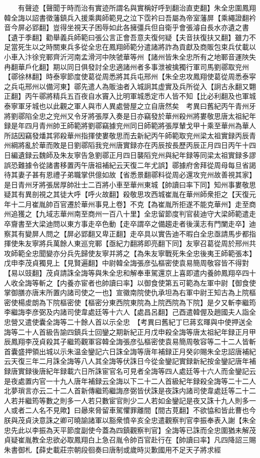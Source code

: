 　　有聲迹【聲聞于時而治有實迹所謂名與實稱好呼到翻治直吏翻】朱全忠圍鳳翔韓全誨以詔書徵藩鎮兵入援乘輿師範見之泣下霑衿曰吾屬為帝室藩屏【乘繩證翻衿音今屏必郢翻】豈得坐視天子困辱如此各擁彊兵但自衛乎會張濬自長水亦遺之書【遺于季翻】勸舉義兵師範曰張公言正會吾意夫復何疑【夫音扶復扶又翻】雖力不足當死生以之時關東兵多從全忠在鳳翔師範分遣諸將詐為貢獻及商販包束兵仗載以小車入汴徐兖鄆齊沂河南孟滑河中陜虢華等州【諸州皆朱全忠所有之地鄆音運陜失冉翻華戶化翻】期以同日俱發討全忠適諸州者多事泄被擒獨行軍司馬劉鄩取兖州【鄩徐林翻】時泰寧節度使葛從周悉將其兵屯邢州【朱全忠攻鳳翔使葛從周悉泰寜之兵屯邢州以備河東】鄩先遣人為販油者入城詗其虚實及兵所從入【詗古永翻又翾正翻】丙午鄩將精兵五百夜自水竇入比明軍城悉定市人皆不知【比必利翻及也軍城泰寧軍牙城也以此觀之軍人與市人異處營屋之立自唐然矣　考異曰舊紀丙午青州牙將劉鄩陷全忠之兖州又令牙將張厚入奏是日亦竊發於華州殺州將婁敬思唐太祖紀年録是年四月青州帥王師範將劉鄩竊據兖州同日師範將張厚輦戈甲十乘至華州為華人所詰因竊發燔其郛殺華州指揮使婁敬思而去新紀丙午師範取兖州梁太祖實録丙辰青州綱將亂於華而敗是日劉鄩䧟我兖州唐實録亦在丙辰按長歷丙辰正月四日丙午十四日編遺録云魏師及朱友寧告急劉鄩正月四日襲䧟兖州與紀年録等同梁太祖實録多謬誤恐難據令從諸書移置丙午唐祖補紀云天復二年尤誤】鄩據府舍拜從周母每旦省謁待其妻子甚有恩禮子弟職掌供億如故【省悉景翻鄩料從周必還攻兖州故善視其家】是日青州牙將張居厚帥壯士二百將小車至華州東城【帥讀曰率下同】知州事婁敬思疑其有異剖視之其徒大呼【呼火故翻】殺敬思攻西城崔胤在華州師衆拒之【天復元年十二月崔胤帥百官遷於華州事見上卷】不克【為崔胤所拒遂不能克華州】走至商州追獲之【九域志華州南至商州一百八十里】全忠留節度判官裴迪守大梁師範遣走卒齎書至大梁迪問以東方事走卒色動【走卒謂卒之備趨走者後漢志有門闌走卒】迪察其有變屏人問之【屏必郢翻又卑正翻】走卒具以實告迪不暇白全忠亟請馬步都指揮使朱友寧將兵萬餘人東巡兖鄆【亟紀力翻將即亮翻下同】友寧召葛從周於邢州共攻師範全忠聞變亦分兵先歸使友寧并將之【為朱友寧戰死朱全忠後夷王師範張本】　戊申李茂貞獨見上【見賢遍翻】中尉韓全誨張彦弘樞密使袁易簡周敬容皆不得對【易以豉翻】茂貞請誅全誨等與朱全忠和解奉車駕還京上喜即遣内養帥鳳翔卒四十人收全誨等斬之【内養亦宦者也帥讀曰率】以御食使第五可範為左軍中尉【御食使掌御膳亦唐末所置内諸司使之一也】宣徽南院使仇承坦為右軍中尉王知古為上院樞密使楊䖍朗為下院樞密使【樞密分東西院東院為上院西院為下院】是夕又斬李繼筠李繼誨李彦弼及内諸司使韋處廷等十六人【處昌呂翻】己酉遣韓偓及趙國夫人詣全忠營又遣使囊全誨等二十餘人首以示全忠　【考異曰舊紀丁巳蔣玄暉與中使押送全誨等二十人首級告諭四鎮兵士回鑾之期新紀正月戊申殺全誨等唐太祖紀年録正月甲辰鳳翔李茂貞殺其子繼筠觀軍容韓全誨張彦弘樞密使袁易簡周敬容等二十二人皆斬首囊盛押領出城以示朱温金鑾記六日誅全誨等唐年補録正月癸卯賜朱全忠詔唐補紀云天復三年二月誅全誨等八人其全誨等伏誅日今從金鑾記實録新紀按金鑾記唐年補録唐實録後唐紀年録載六日所誅宦官名可見者全誨等四人處廷等十六人而金鑾記云是夜處置内官一十九人唐年補録云全誨以下二十二人首級紀年録殺全誨等二十二人北夢瑣言亦云二十二人首新傳繼筠繼誨彦弼皆伏誅是夜誅内諸司使韋處廷等二十二人若并繼筠等數之則多一人若只數宦官則少二人若如金鑾記是夜又誅十九人則多一人或者二人名不見歟】曰曏來脅留車駕懼罪離間【間古莧翻】不欲恊和皆此曹也今朕與茂貞決意誅之卿可曉諭諸軍以豁衆憤辛亥全忠遣觀察判官李振奉表入謝【朱全忠先此以李振為天平節度副使今蓋為四鎮觀察判官】全誨等已誅而全忠圍猶未解茂貞疑崔胤教全忠欲必取鳳翔白上急召胤令帥百官赴行在【帥讀曰率】凡四降詔三賜朱書御札【薛史載莊宗朝段徊奏曰唐制或歲時災歉國用不足天子將求經